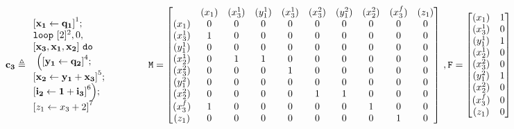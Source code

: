 \documentclass[a4paper,11pt]{article}
\begin{document}
%
\[\ssa{c_3} \triangleq
\begin{array}{l}
     \left[\ssa{ x_1 \leftarrow q_1}  \right]^1 ; \\
    \eloop ~ [2]^{2} , 0,\\
  \ssa{[x_3 , x_1 , x_2]} 
     ~ \edo
    \\
    ~ \Big( 
    \left[\ssa{ y_1 \leftarrow q_2} \right]^4; \\
    \left[\ssa{x_2 \leftarrow y_1  + x_3 } \right]^5; \\
    \left[\ssa{i_2 \leftarrow 1  + i_3 } \right]^6
    \Big) ; \\
     \left[ \assign{z_1}{x_3 + 2}  \right]^{7}
\end{array}
~~~~~~~~~~~~
\Mtrix =  \left[ \begin{matrix}
 & (x_1) & (x_3^{1}) & (y_1^{1}) & (x_3^{1})  & (x_3^{2}) & (y_1^{2}) & (x_2^{2}) & (x_3^{f}) &  (z_1) \\
(x_1) & 0 & 0 & 0 & 0 & 0 & 0 & 0 &0 &0 \\
(x_3^{1}) & 1 & 0 & 0 & 0 & 0 & 0 & 0&0&0\\
(y_1^{1}) & 0 & 0 & 0 & 0 & 0 & 0& 0& 0 &0\\
(x_2^{1}) & 0 & 1 & 1 & 0 & 0 & 0 & 0& 0&0\\
(x_3^{2}) & 0 & 0 & 0 & 1 & 0 & 0 & 0 & 0&0 \\
(y_1^{2}) & 0 & 0 & 0 & 0 & 0 & 0 & 0& 0&0\\
(x_2^{2}) & 0 & 0 & 0 & 0 & 1 & 1 & 0& 0&0\\
(x_3^{f}) & 1 & 0 & 0 & 0 & 0 & 0 & 1& 0&0\\
(z_1) & 0 & 0 & 0 & 0 & 0 & 0 & 0 & 1 &0 \\
\end{matrix} \right] ~ , 
\flag = \left [ \begin{matrix}
(x_1) &  1 \\
(x_3^{1}) & 0 \\
(y_1^{1}) & 1 \\
(x_2^{1}) & 0 \\
(x_3^{2}) & 0 \\
(y_1^{2}) & 1 \\
(x_2^{2}) & 0 \\
(x_3^{f}) & 0 \\
(z_1) &  0 \\
\end{matrix} \right ]
\]
%
\end{document}
